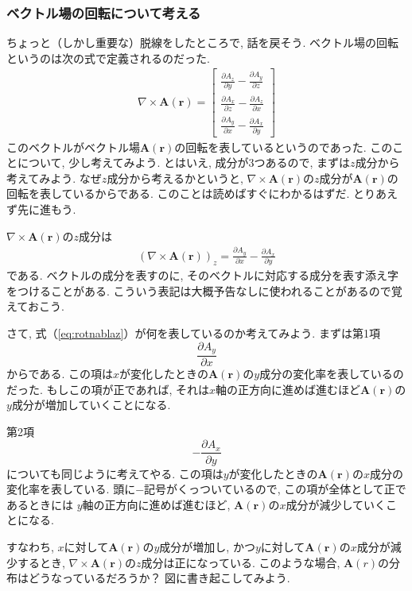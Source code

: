 \subsubsection{ベクトル場の回転について考える}
ちょっと（しかし重要な）脱線をしたところで, 話を戻そう. ベクトル場の回転というのは次の式で定義されるのだった. 
\begin{eqnarray}
\nabla \times \bm{A}(\bm{r}) = \left[
\begin{array}{c}
\displaystyle
\frac{\partial A_z}{\partial y} - \frac{\partial A_y}{\partial z} \\
\displaystyle
\frac{\partial A_x}{\partial z} - \frac{\partial A_z}{\partial x} \\
\displaystyle
\frac{\partial A_y}{\partial x} - \frac{\partial A_x}{\partial y} 
\end{array}
\right]
\label{eq:rotnabla2}
\end{eqnarray}
このベクトルがベクトル場$\bm{A}(\bm{r})$の回転を表しているというのであった. 
このことについて, 少し考えてみよう. とはいえ, 成分が3つあるので, まずは$z$成分から考えてみよう. 
なぜ$z$成分から考えるかというと, $\nabla \times \bm{A}(\bm{r})$の$z$成分が$\bm{A}(\bm{r})$の回転を表しているからである. 
このことは読めばすぐにわかるはずだ. とりあえず先に進もう. 

$\nabla \times \bm{A}(\bm{r})$の$z$成分は
\begin{eqnarray}
(\nabla \times \bm{A}(\bm{r}))_z = \frac{\partial A_y}{\partial x} - \frac{\partial A_x}{\partial y} 
\label{eq:rotnablaz}
\end{eqnarray}
である. ベクトルの成分を表すのに, そのベクトルに対応する成分を表す添え字をつけることがある. 
こういう表記は大概予告なしに使われることがあるので覚えておこう. 

さて, 式（\ref{eq:rotnablaz}）が何を表しているのか考えてみよう. 
まずは第1項
$$
\frac{\partial A_y}{\partial x}
$$
からである. この項は$x$が変化したときの$\bm{A}(\bm{r})$の$y$成分の変化率を表しているのだった. 
もしこの項が正であれば, それは$x$軸の正方向に進めば進むほど$\bm{A}(\bm{r})$の$y$成分が増加していくことになる. 

第2項
$$
-\frac{\partial A_x}{\partial y}
$$
についても同じように考えてやる. この項は$y$が変化したときの$\bm{A}(\bm{r})$の$x$成分の変化率を表している. 
頭に$-$記号がくっついているので, 
この項が全体として正であるときには
$y$軸の正方向に進めば進むほど, $\bm{A}(\bm{r})$の$x$成分が減少していくことになる. 

すなわち, $x$に対して$\bm{A}(\bm{r})$の$y$成分が増加し, かつ$y$に対して$\bm{A}(\bm{r})$の$x$成分が減少するとき, 
$\nabla \times \bm{A}(\bm{r})$の$z$成分は正になっている. 
このような場合, $\bm{A}(r)$の分布はどうなっているだろうか？ 図に書き起こしてみよう. 

